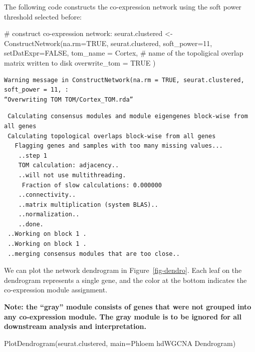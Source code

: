 \documentclass[
  letterpaper,
  DIV=11,
  numbers=noendperiod]{scrartcl}
\newenvironment{Shaded}{\begin{snugshade}}{\end{snugshade}}
\newcommand{\AttributeTok}[1]{\textcolor[rgb]{0.40,0.45,0.13}{#1}}
\newcommand{\CommentTok}[1]{\textcolor[rgb]{0.37,0.37,0.37}{#1}}
\newcommand{\ConstantTok}[1]{\textcolor[rgb]{0.56,0.35,0.01}{#1}}
\newcommand{\DecValTok}[1]{\textcolor[rgb]{0.68,0.00,0.00}{#1}}
\newcommand{\FunctionTok}[1]{\textcolor[rgb]{0.28,0.35,0.67}{#1}}
\newcommand{\NormalTok}[1]{\textcolor[rgb]{0.00,0.23,0.31}{#1}}
\newcommand{\OtherTok}[1]{\textcolor[rgb]{0.00,0.23,0.31}{#1}}
\newcommand{\StringTok}[1]{\textcolor[rgb]{0.13,0.47,0.30}{#1}}
\begin{document}
The following code constructs the co-expression network using the soft
power threshold selected before:

\begin{Shaded}
\begin{Highlighting}[]
\CommentTok{\# construct co{-}expression network:}
\NormalTok{seurat.clustered }\OtherTok{\textless{}{-}} \FunctionTok{ConstructNetwork}\NormalTok{(}\AttributeTok{na.rm=}\ConstantTok{TRUE}\NormalTok{,}
\NormalTok{  seurat.clustered,}
  \AttributeTok{soft\_power=}\DecValTok{11}\NormalTok{,                                   }
  \AttributeTok{setDatExpr=}\ConstantTok{FALSE}\NormalTok{,}
  \AttributeTok{tom\_name =} \StringTok{\textquotesingle{}Cortex\textquotesingle{}}\NormalTok{, }\CommentTok{\# name of the topoligical overlap matrix written to disk}
  \AttributeTok{overwrite\_tom =} \ConstantTok{TRUE}
\NormalTok{)}
\end{Highlighting}
\end{Shaded}

\begin{verbatim}
Warning message in ConstructNetwork(na.rm = TRUE, seurat.clustered, soft_power = 11, :
“Overwriting TOM TOM/Cortex_TOM.rda”
\end{verbatim}

\begin{verbatim}
 Calculating consensus modules and module eigengenes block-wise from all genes
 Calculating topological overlaps block-wise from all genes
   Flagging genes and samples with too many missing values...
    ..step 1
    TOM calculation: adjacency..
    ..will not use multithreading.
     Fraction of slow calculations: 0.000000
    ..connectivity..
    ..matrix multiplication (system BLAS)..
    ..normalization..
    ..done.
 ..Working on block 1 .
 ..Working on block 1 .
 ..merging consensus modules that are too close..
\end{verbatim}

We can plot the network dendrogram in Figure~\ref{fig-dendro}. Each leaf
on the dendrogram represents a single gene, and the color at the bottom
indicates the co-expression module assignment.

\textbf{Note: the ``gray'' module consists of genes that were not
grouped into any co-expression module. The gray module is to be ignored
for all downstream analysis and interpretation.}

\begin{Shaded}
\begin{Highlighting}[]
\FunctionTok{PlotDendrogram}\NormalTok{(seurat.clustered, }\AttributeTok{main=}\StringTok{\textquotesingle{}Phloem hdWGCNA Dendrogram\textquotesingle{}}\NormalTok{)}
\end{Highlighting}
\end{Shaded}
\end{document}
